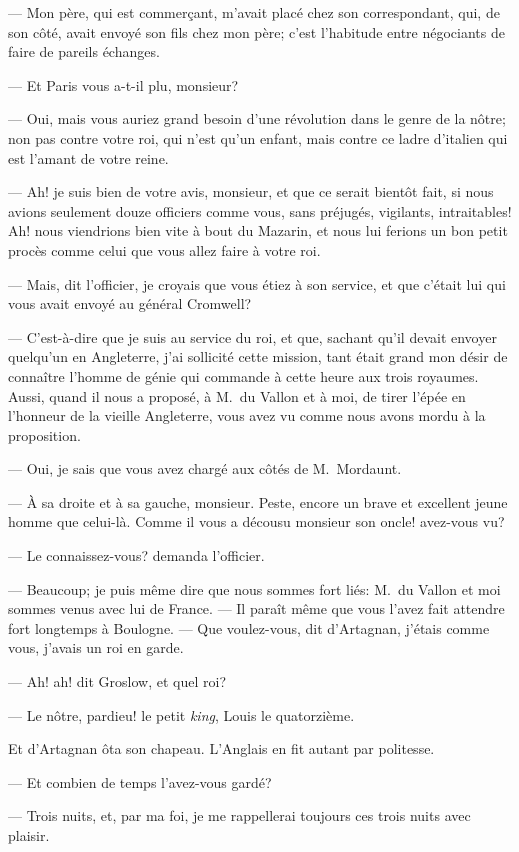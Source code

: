 — Mon père, qui est commerçant, m'avait placé chez son correspondant, qui, de son côté, avait envoyé son fils chez mon père; c'est l'habitude entre négociants de faire de pareils échanges.

— Et Paris vous a-t-il plu, monsieur?

— Oui, mais vous auriez grand besoin d'une révolution dans le genre de la nôtre; non pas contre votre roi, qui n'est qu'un enfant, mais contre ce ladre d'italien qui est l'amant de votre reine.

— Ah! je suis bien de votre avis, monsieur, et que ce serait bientôt fait, si nous avions seulement douze officiers comme vous, sans préjugés, vigilants, intraitables! Ah! nous viendrions bien vite à bout du Mazarin, et nous lui ferions un bon petit procès comme celui que vous allez faire à votre roi.

— Mais, dit l'officier, je croyais que vous étiez à son service, et que c'était lui qui vous avait envoyé au général Cromwell?

— C'est-à-dire que je suis au service du roi, et que, sachant qu'il devait envoyer quelqu'un en Angleterre, j'ai sollicité cette mission, tant était grand mon désir de connaître l'homme de génie qui commande à cette heure aux trois royaumes. Aussi, quand il nous a proposé, à M.~du Vallon et à moi, de tirer l'épée en l'honneur de la vieille Angleterre, vous avez vu comme nous avons mordu à la proposition.

— Oui, je sais que vous avez chargé aux côtés de M.~Mordaunt.

— À sa droite et à sa gauche, monsieur. Peste, encore un brave et excellent jeune homme que celui-là. Comme il vous a décousu monsieur son oncle! avez-vous vu?

— Le connaissez-vous? demanda l'officier.

— Beaucoup; je puis même dire que nous sommes fort liés: M.~du Vallon et moi sommes venus avec lui de France.
— Il paraît même que vous l'avez fait attendre fort longtemps à Boulogne.
— Que voulez-vous, dit d'Artagnan, j'étais comme vous, j'avais un roi en garde.

— Ah! ah! dit Groslow, et quel roi?

— Le nôtre, pardieu! le petit \textit{king}, Louis le quatorzième.

Et d'Artagnan ôta son chapeau. L'Anglais en fit autant par politesse.

— Et combien de temps l'avez-vous gardé?

— Trois nuits, et, par ma foi, je me rappellerai toujours ces trois nuits avec plaisir.

